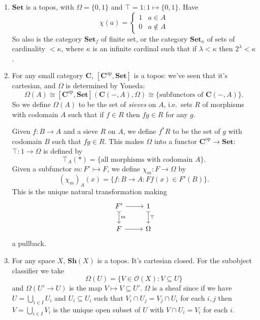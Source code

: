 \documentclass[a4paper]{article}
\renewcommand{\c}[1]{\mathbf{#1}}
\newcommand{\Set}{{\c{Set}}}
\newcommand{\Sh}{{\c{Sh}}}
\newcommand{\mono}{\rightarrowtail}
\begin{document}
\begin{eg}\leavevmode
  \begin{enumerate}
  \item \(\Set\) is a topos, with \(\Omega = \{0, 1\}\) and \(\top = 1: 1 \mapsto \{0, 1\}\). Have
    \[
      \chi(a) =
      \begin{cases}
        1 & a \in A \\
        0 & a \notin A
      \end{cases}
    \]
    So also is the category \(\Set_f\) of finite set, or the category \(\Set_\kappa\) of sets of cardinality \(< \kappa\), where \(\kappa\) is an infinite cardinal such that if \(\lambda < \kappa\) then \(2^\lambda < \kappa\). %
  \item For any small category \(\c C\), \([\c C^{\text{op}}, \Set]\) is a topos: we've seen that it's cartesian, and \(\Omega\) is determined by Yoneda:
    \[
      \Omega(A) \cong [\c C^{\text{op}}, \Set](\c C(-, A), \Omega) \cong \{\text{subfunctors of } \c C(-, A)\}.
    \]
    So we define \(\Omega(A)\) to be the set of \emph{sieves} on \(A\), i.e.\ sets \(R\) of morphisms with codomain \(A\) such that if \(f \in R\) then \(fg \in R\) for any \(g\).

    Given \(f: B \to A\) and a sieve \(R\) on \(A\), we define \(f^*R\) to be the set of \(g\) with codomain \(B\) such that \(fg \in R\). This makes \(\Omega\) into a functor \(\c C^{\text{op}} \to \Set\): \(\top: 1 \to \Omega\) is defined by
    \[
      \top_A(*) = \{\text{all morphisms with codomain } A\}.
    \]
    Given a subfunctor \(m: F' \mono F\), we define \(\chi_m: F \to \Omega\) by
    \[
      (\chi_m)_A(x) = \{f: B \to A: Ff(x) \in F'(B)\}.
    \]
    This is the unique natural transformation making
    \[
      \begin{tikzcd}
        F' \ar[r] \ar[d, "m", tail] & 1 \ar[d, "\top", tail] \\
        F \ar[r] & \Omega
      \end{tikzcd}
    \]
    a pullback.
  \item For any space \(X\), \(\Sh(X)\) is a topos. It's cartesian closed. For the subobject classifier we take
    \[
      \Omega(U) = \{V \in \mathcal O(X): V \subseteq U\}
    \]
    and \(\Omega(U' \to U)\) is the map \(V \mapsto V \subseteq U'\). \(\Omega\) is a sheaf since if we have \(U = \bigcup_{i \in I} U_i\) and \(U_i \subseteq U_i\) such that \(V_i \cap U_j = V_j \cap U_i\) for each \(i, j\) then \(V = \bigcup_{i \in I} V_i\) is the unique open subset of \(U\) with \(V \cap U_i = V_i\) for each \(i\).


\end{enumerate}
\end{eg}
\end{document}
